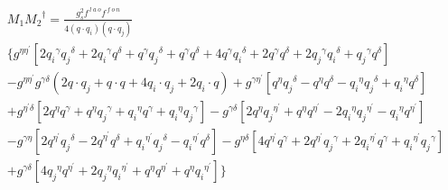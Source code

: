 \begin{equation}
\begin{split}
&M_1{M_2}^{\dagger}=\frac{g_s^2 f^{\:l\:a\:o} f^{\:f\: o\:n}}{4(q \cdot q_i) (q \cdot q_j)}\\
&\lbrace g^{{{\eta}}{{\eta}^{\prime}}}[2{q_i}^{{\gamma}}{q_j}^{\delta}+2{q_i}^{{\gamma}}{q}^{\delta}+{q}^{{\gamma}}{q_j}^{\delta}+{q}^{{\gamma}}{q}^{\delta}+4q^{{\gamma}}{q_i}^{\delta}+2q^{{\gamma}}{q}^{\delta}+2{q_j}^{{\gamma}}{q_i}^{\delta}+{q_j}^{{\gamma}}{q}^{\delta}]\\
&-g^{{{\eta}}{{\eta}^{\prime}}}g^{{{\gamma}}{{\delta}}}(2q\cdot q_j+ q\cdot q+4q_i \cdot q_j+2q_i \cdot q)+g^{{{\gamma}}{{\eta}^{\prime}}}[{q}^{{\eta}}{q_j}^{\delta}-{q}^{{\eta}}{q}^{\delta}-{q_i}^{{\eta}}{q_j}^{\delta}+{q_i}^{{\eta}}{q}^{\delta}]\\
&+g^{{{\eta}^{\prime}}{{\delta}}}[2{q}^{{\eta}}{q}^{\gamma}+{q}^{{\eta}}{q_j}^{\gamma}+{q_i}^{{\eta}}{q}^{\gamma}+{q_i}^{{\eta}}{q_j}^{\gamma}]-g^{{{\gamma}}{{\delta}}}[2{q}^{\eta}{q_j}^{{\eta}^{\prime}}+{q}^{\eta}{q}^{{\eta}^{\prime}}-2{q_i}^{\eta}{q_j}^{{\eta}^{\prime}}-{q_i}^{\eta}{q}^{{\eta}^{\prime}}]\\
&-g^{{{\gamma}}{{\eta}}}[2{q}^{{\eta}^{\prime}}{q_j}^{{\delta}}-{2q}^{{\eta}^{\prime}}{q}^{{\delta}}+{q_i}^{{\eta}^{\prime}}{q_j}^{{\delta}}-{q_i}^{{\eta}^{\prime}}{q}^{{\delta}}]-g^{{{\eta}}{{\delta}}}[4{q}^{{\eta}^{\prime}}{q}^{{\gamma}}+2{q}^{{\eta}^{\prime}}{q_j}^{{\gamma}}+2{q_i}^{{\eta}^{\prime}}{q}^{{\gamma}}+{q_i}^{{\eta}^{\prime}}{q_j}^{{\gamma}}]\\
&+g^{{{\gamma}}{{\delta}}}[4{q_j}^{{\eta}}{q}^{{\eta}^{\prime}}+2{q_j}^{{\eta}}{q_i}^{{\eta}^{\prime}}+{q}^{{\eta}}{q}^{{\eta}^{\prime}}+{q}^{{\eta}}{q_i}^{{\eta}^{\prime}}]\rbrace
\end{split}
\end{equation}



